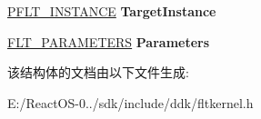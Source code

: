 \begin{DoxyCompactItemize}
\mbox{\label{struct___f_l_t___i_o___p_a_r_a_m_e_t_e_r___b_l_o_c_k_a1964acadf45c7e6e1eefabd7e456dafb}} 
\hyperlink{struct___f_l_t___i_n_s_t_a_n_c_e}{P\+F\+L\+T\+\_\+\+I\+N\+S\+T\+A\+N\+CE} {\bfseries Target\+Instance}
\item 
\mbox{\label{struct___f_l_t___i_o___p_a_r_a_m_e_t_e_r___b_l_o_c_k_a2816949ae1796005555bff0dbd2aebf2}} 
\hyperlink{union___f_l_t___p_a_r_a_m_e_t_e_r_s}{F\+L\+T\+\_\+\+P\+A\+R\+A\+M\+E\+T\+E\+RS} {\bfseries Parameters}
\end{DoxyCompactItemize}


该结构体的文档由以下文件生成\+:\begin{DoxyCompactItemize}
\item 
E\+:/\+React\+O\+S-\/0../sdk/include/ddk/fltkernel.\+h\end{DoxyCompactItemize}
